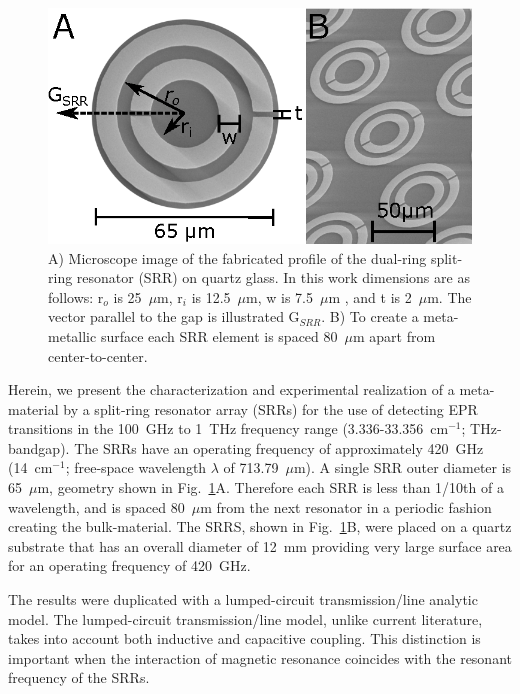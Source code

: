 \begin{figure}[htpb]
\centering
  \includegraphics{Kapitel/Ch3-Images/01-Measurements.eps}%
  \caption[Microscope image of the SRR geometry.]{ A) Microscope image of the fabricated profile of the dual-ring split-ring resonator (SRR) on quartz glass. In this work dimensions are as follows: r$_o$ is 25~$\mu$m, r$_i$ is 12.5~$\mu$m, w is 7.5~$\mu$m , and t is 2~$\mu$m. The vector parallel to the gap is illustrated G$_{SRR}$. B) To create a meta-metallic surface each SRR element is spaced 80~$\mu$m apart from center-to-center.}
  \label{ch3-fig:sizes}
\end{figure}

Herein, we present the characterization and experimental realization of a meta-material by a split-ring resonator array (SRRs) for the use of detecting EPR transitions in the 100~GHz to 1~THz frequency range (3.336-33.356~cm$^{-1}$; THz-bandgap). The SRRs have an operating frequency of approximately 420~GHz (14~cm$^{-1}$; free-space wavelength $\lambda$ of 713.79~$\mu$m). A single SRR outer diameter is 65~$\mu$m, geometry shown in Fig.~\ref{ch3-fig:sizes}A. Therefore each SRR is less than 1/10th of a wavelength, and is spaced 80~$\mu$m from the next resonator in a periodic fashion creating the bulk-material. The SRRS, shown in Fig.~\ref{ch3-fig:sizes}B, were placed on a quartz substrate that has an overall diameter of 12~mm providing very large surface area for an operating frequency of 420~GHz.

The results were duplicated with a lumped-circuit transmission\-/line analytic model. The lumped-circuit transmission\-/line model, unlike current literature, takes into account both inductive and capacitive coupling. This distinction is important when the interaction of magnetic resonance coincides with the resonant frequency of the SRRs.

